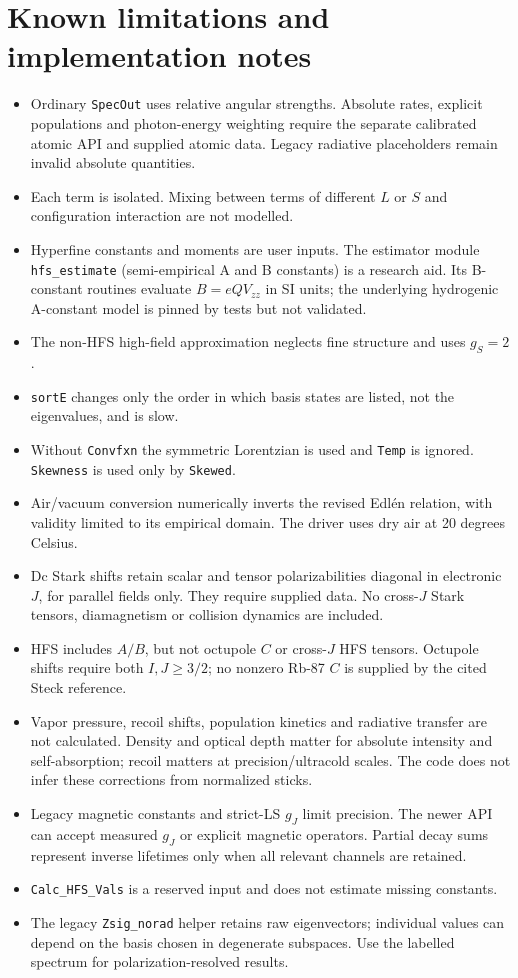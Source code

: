 \documentclass[11pt,a4paper]{article}
\newcommand{\code}[1]{\texttt{#1}}
\numberwithin{equation}{section}
\begin{document}
\section{Known limitations and implementation notes}\label{sec:limitations}
\begin{itemize}\setlength\itemsep{0pt}
\item Ordinary \code{SpecOut} uses relative angular strengths. Absolute rates, explicit populations and photon-energy weighting require the separate calibrated atomic API and supplied atomic data. Legacy radiative placeholders remain invalid absolute quantities.
\item Each term is isolated. Mixing between terms of different $L$ or $S$ and configuration interaction are not modelled.
\item Hyperfine constants and moments are user inputs. The estimator module \code{hfs\_estimate} (semi-empirical A and B constants) is a research aid. Its B-constant routines evaluate $B=eQV_{zz}$ in SI units; the underlying hydrogenic A-constant model is pinned by tests but not validated.
\item The non-HFS high-field approximation neglects fine structure and uses $g_S=2$.
\item \code{sortE} changes only the order in which basis states are listed, not the eigenvalues, and is slow.
\item Without \code{Convfxn} the symmetric Lorentzian is used and \code{Temp} is ignored. \code{Skewness} is used only by \code{Skewed}.
\item Air/vacuum conversion numerically inverts the revised Edl\'en relation, with validity limited to its empirical domain. The driver uses dry air at 20 degrees Celsius.
\item Dc Stark shifts retain scalar and tensor polarizabilities diagonal in electronic $J$, for parallel fields only. They require supplied data. No cross-$J$ Stark tensors, diamagnetism or collision dynamics are included.
\item HFS includes $A/B$, but not octupole $C$ or cross-$J$ HFS tensors. Octupole shifts require both $I,J\geq3/2$; no nonzero Rb-87 $C$ is supplied by the cited Steck reference.
\item Vapor pressure, recoil shifts, population kinetics and radiative transfer are not calculated. Density and optical depth matter for absolute intensity and self-absorption; recoil matters at precision/ultracold scales. The code does not infer these corrections from normalized sticks.
\item Legacy magnetic constants and strict-LS $g_J$ limit precision. The newer API can accept measured $g_J$ or explicit magnetic operators. Partial decay sums represent inverse lifetimes only when all relevant channels are retained.
\item \code{Calc\_HFS\_Vals} is a reserved input and does not estimate missing constants.
\item The legacy \code{Zsig\_norad} helper retains raw eigenvectors; individual values can depend on the basis chosen in degenerate subspaces. Use the labelled spectrum for polarization-resolved results.
\end{itemize}
\end{document}
